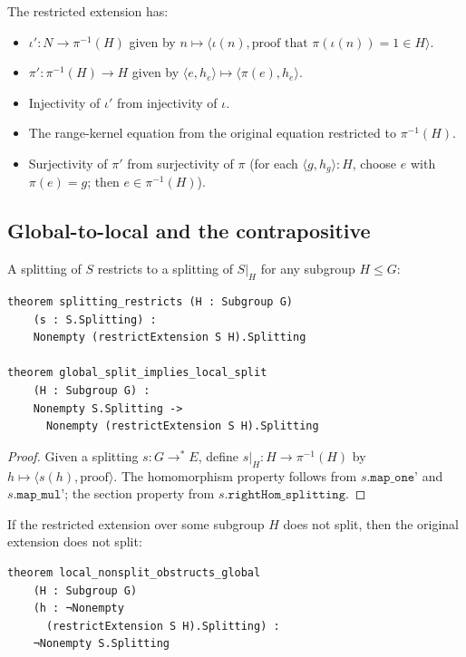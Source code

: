\documentclass[11pt]{article}
\newcommand{\lean}[1]{\texttt{#1}}
\begin{document}
\noindent
The restricted extension has:
\begin{itemize}[leftmargin=2em]
  \item $\iota' : N \to \pi^{-1}(H)$ given by $n \mapsto \langle \iota(n),
    \text{proof that } \pi(\iota(n)) = 1 \in H \rangle$.
  \item $\pi' : \pi^{-1}(H) \to H$ given by $\langle e, h_e \rangle \mapsto
    \langle \pi(e), h_e \rangle$.
  \item Injectivity of $\iota'$ from injectivity of $\iota$.
  \item The range-kernel equation from the original equation restricted to $\pi^{-1}(H)$.
  \item Surjectivity of $\pi'$ from surjectivity of $\pi$ (for each $\langle g, h_g
    \rangle : H$, choose $e$ with $\pi(e) = g$; then $e \in \pi^{-1}(H)$).
\end{itemize}

\subsection{Global-to-local and the contrapositive}\label{sec:global-local}

\begin{theorem}\label{thm:global-restricts}
A splitting of $S$ restricts to a splitting of $S|_H$ for any subgroup $H \le G$:
\begin{lstlisting}
theorem splitting_restricts (H : Subgroup G)
    (s : S.Splitting) :
    Nonempty (restrictExtension S H).Splitting

theorem global_split_implies_local_split
    (H : Subgroup G) :
    Nonempty S.Splitting ->
      Nonempty (restrictExtension S H).Splitting
\end{lstlisting}
\end{theorem}

\begin{proof}
Given a splitting $s : G \to^* E$, define $s|_H : H \to \pi^{-1}(H)$ by
$h \mapsto \langle s(h), \text{proof} \rangle$.  The homomorphism property follows
from $s.\lean{map\_one'}$ and $s.\lean{map\_mul'}$; the section property from
$s.\lean{rightHom\_splitting}$.
\end{proof}

\begin{theorem}\label{thm:local-obstruction}
If the restricted extension over some subgroup $H$ does not split, then the
original extension does not split:
\begin{lstlisting}
theorem local_nonsplit_obstructs_global
    (H : Subgroup G)
    (h : ¬Nonempty
      (restrictExtension S H).Splitting) :
    ¬Nonempty S.Splitting
\end{lstlisting}
\end{theorem}
\end{document}
